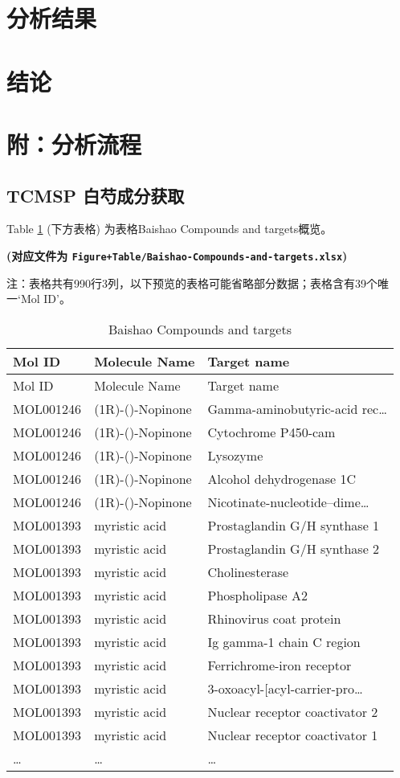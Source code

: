 \documentclass[
]{article}
\begin{document}
\hypertarget{results}{%
\section{分析结果}\label{results}}

\hypertarget{dis}{%
\section{结论}\label{dis}}

\hypertarget{workflow}{%
\section{附：分析流程}\label{workflow}}

\hypertarget{tcmsp-ux767dux828dux6210ux5206ux83b7ux53d6}{%
\subsection{TCMSP 白芍成分获取}\label{tcmsp-ux767dux828dux6210ux5206ux83b7ux53d6}}

Table \ref{tab:Baishao-Compounds-and-targets} (下方表格) 为表格Baishao Compounds and targets概览。

\textbf{(对应文件为 \texttt{Figure+Table/Baishao-Compounds-and-targets.xlsx})}

\begin{center}\begin{tcolorbox}[colback=gray!10, colframe=gray!50, width=0.9\linewidth, arc=1mm, boxrule=0.5pt]注：表格共有990行3列，以下预览的表格可能省略部分数据；表格含有39个唯一`Mol ID'。
\end{tcolorbox}
\end{center}

\begin{longtable}[]{@{}lll@{}}
\caption{\label{tab:Baishao-Compounds-and-targets}Baishao Compounds and targets}\tabularnewline
\toprule
Mol ID & Molecule Name & Target name\tabularnewline
\midrule
\endfirsthead
\toprule
Mol ID & Molecule Name & Target name\tabularnewline
\midrule
\endhead
MOL001246 & (1R)-()-Nopinone & Gamma-aminobutyric-acid rec\ldots{}\tabularnewline
MOL001246 & (1R)-()-Nopinone & Cytochrome P450-cam\tabularnewline
MOL001246 & (1R)-()-Nopinone & Lysozyme\tabularnewline
MOL001246 & (1R)-()-Nopinone & Alcohol dehydrogenase 1C\tabularnewline
MOL001246 & (1R)-()-Nopinone & Nicotinate-nucleotide--dime\ldots{}\tabularnewline
MOL001393 & myristic acid & Prostaglandin G/H synthase 1\tabularnewline
MOL001393 & myristic acid & Prostaglandin G/H synthase 2\tabularnewline
MOL001393 & myristic acid & Cholinesterase\tabularnewline
MOL001393 & myristic acid & Phospholipase A2\tabularnewline
MOL001393 & myristic acid & Rhinovirus coat protein\tabularnewline
MOL001393 & myristic acid & Ig gamma-1 chain C region\tabularnewline
MOL001393 & myristic acid & Ferrichrome-iron receptor\tabularnewline
MOL001393 & myristic acid & 3-oxoacyl-{[}acyl-carrier-pro\ldots{}\tabularnewline
MOL001393 & myristic acid & Nuclear receptor coactivator 2\tabularnewline
MOL001393 & myristic acid & Nuclear receptor coactivator 1\tabularnewline
\ldots{} & \ldots{} & \ldots{}\tabularnewline
\bottomrule
\end{longtable}
\end{document}
